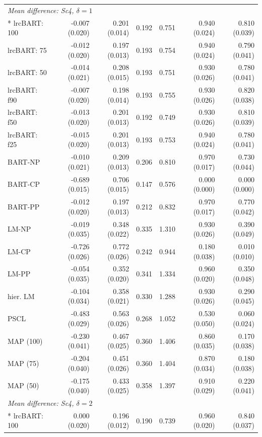 \begin{landscape}
\begin{longtable}{lrrrrrr}
\multicolumn{7}{l}{\strut\textit{Mean difference: Sc4, $\delta=1$}}\\*
lrcBART: 100 & -0.007 (0.020) & 0.201 (0.014) & 0.192 & 0.751 & 0.940 (0.024) & 0.810 (0.039) \\
lrcBART: 75 & -0.012 (0.020) & 0.197 (0.013) & 0.193 & 0.754 & 0.940 (0.024) & 0.790 (0.041) \\
lrcBART: 50 & -0.014 (0.021) & 0.208 (0.015) & 0.193 & 0.751 & 0.930 (0.026) & 0.780 (0.041) \\
lrcBART: f90 & -0.007 (0.020) & 0.198 (0.014) & 0.193 & 0.755 & 0.930 (0.026) & 0.820 (0.038) \\
lrcBART: f50 & -0.013 (0.020) & 0.201 (0.013) & 0.192 & 0.749 & 0.930 (0.026) & 0.810 (0.039) \\
lrcBART: f25 & -0.015 (0.020) & 0.201 (0.013) & 0.193 & 0.753 & 0.940 (0.024) & 0.780 (0.041) \\
BART-NP & -0.010 (0.021) & 0.209 (0.013) & 0.206 & 0.810 & 0.970 (0.017) & 0.730 (0.044) \\
BART-CP & -0.689 (0.015) & 0.706 (0.015) & 0.147 & 0.576 & 0.000 (0.000) & 0.000 (0.000) \\
BART-PP & -0.012 (0.020) & 0.197 (0.013) & 0.212 & 0.832 & 0.970 (0.017) & 0.770 (0.042) \\
LM-NP & -0.019 (0.035) & 0.348 (0.022) & 0.335 & 1.310 & 0.930 (0.026) & 0.390 (0.049) \\
LM-CP & -0.726 (0.026) & 0.772 (0.026) & 0.242 & 0.944 & 0.180 (0.038) & 0.010 (0.010) \\
LM-PP & -0.054 (0.035) & 0.352 (0.020) & 0.341 & 1.334 & 0.960 (0.020) & 0.350 (0.048) \\
hier. LM & -0.104 (0.034) & 0.358 (0.021) & 0.330 & 1.288 & 0.930 (0.026) & 0.290 (0.045) \\
PSCL & -0.483 (0.029) & 0.563 (0.026) & 0.268 & 1.052 & 0.530 (0.050) & 0.060 (0.024) \\
MAP (100) & -0.230 (0.041) & 0.467 (0.025) & 0.360 & 1.406 & 0.860 (0.035) & 0.170 (0.038) \\
MAP (75) & -0.204 (0.040) & 0.451 (0.026) & 0.360 & 1.404 & 0.870 (0.034) & 0.180 (0.038) \\
MAP (50) & -0.175 (0.040) & 0.433 (0.025) & 0.358 & 1.397 & 0.910 (0.029) & 0.220 (0.041) \\
\multicolumn{7}{l}{\strut\textit{Mean difference: Sc4, $\delta=2$}}\\*
lrcBART: 100 & 0.000 (0.020) & 0.196 (0.012) & 0.190 & 0.739 & 0.960 (0.020) & 0.840 (0.037) \\

\end{longtable}
\end{landscape}
